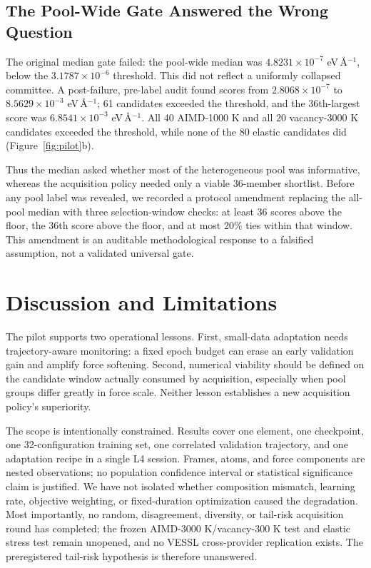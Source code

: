 \documentclass{article}
\begin{document}
\subsection{The Pool-Wide Gate Answered the Wrong Question}

The original median gate failed: the pool-wide median was $4.8231\times10^{-7}$ eV\,\AA$^{-1}$, below the $3.1787\times10^{-6}$ threshold. This did not reflect a uniformly collapsed committee. A post-failure, pre-label audit found scores from $2.8068\times10^{-7}$ to $8.5629\times10^{-3}$ eV\,\AA$^{-1}$; 61 candidates exceeded the threshold, and the 36th-largest score was $6.8541\times10^{-3}$ eV\,\AA$^{-1}$. All 40 AIMD-1000 K and all 20 vacancy-3000 K candidates exceeded the threshold, while none of the 80 elastic candidates did (Figure~\ref{fig:pilot}b).

Thus the median asked whether most of the heterogeneous pool was informative, whereas the acquisition policy needed only a viable 36-member shortlist. Before any pool label was revealed, we recorded a protocol amendment replacing the all-pool median with three selection-window checks: at least 36 scores above the floor, the 36th score above the floor, and at most 20\% ties within that window. This amendment is an auditable methodological response to a falsified assumption, not a validated universal gate.

\section{Discussion and Limitations}

The pilot supports two operational lessons. First, small-data adaptation needs trajectory-aware monitoring: a fixed epoch budget can erase an early validation gain and amplify force softening. Second, numerical viability should be defined on the candidate window actually consumed by acquisition, especially when pool groups differ greatly in force scale. Neither lesson establishes a new acquisition policy's superiority.

The scope is intentionally constrained. Results cover one element, one checkpoint, one 32-configuration training set, one correlated validation trajectory, and one adaptation recipe in a single L4 session. Frames, atoms, and force components are nested observations; no population confidence interval or statistical significance claim is justified. We have not isolated whether composition mismatch, learning rate, objective weighting, or fixed-duration optimization caused the degradation. Most importantly, no random, disagreement, diversity, or tail-risk acquisition round has completed; the frozen AIMD-3000 K/vacancy-300 K test and elastic stress test remain unopened, and no VESSL cross-provider replication exists. The preregistered tail-risk hypothesis is therefore unanswered.
\end{document}
